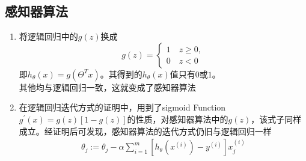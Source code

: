 \subsection{感知器算法}
\begin{enumerate}
	\item 将逻辑回归中的$g(z)$换成
	\[ g(z)=\begin{cases}
	1 \quad z \geq 0, \\
	0 \quad z <0
	\end{cases} \]
	即$h_\theta(x) = g(\Theta^Tx)$。其得到的$h_\theta(x)$值只有$0$或$1$。 \\
	其他均与逻辑回归一致，这就变成了感知器算法
	\item 在逻辑回归迭代方式的证明中，用到了sigmoid Function $g^{'}{(x)} = g(z)\left[1-g(z)\right]$的性质，对感知器算法中的$g(z)$，该式子同样成立。经证明后可发现，感知器算法的迭代方式仍旧与逻辑回归一样
	\begin{align}
		\theta_j :=  \theta_j - \alpha \sum_{i=1}^{m} \left[h_\theta(x^{(i)}) - y^{(i)} \right]x_j^{(i)}
	\end{align}
\end{enumerate}
















